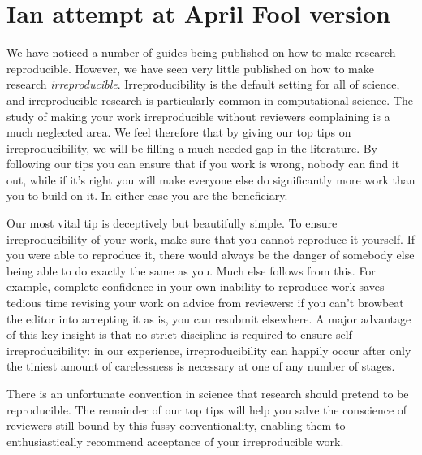 \documentclass[a4paper,11pt]{article}
\begin{document}
\section{Ian attempt at April Fool version}

We have noticed a number of guides being published on how to make research reproducible. However, we have seen very little published on how to make research \emph{irreproducible}.  Irreproducibility is the default setting for all of science, and irreproducible research is particularly common in computational science.  The study of making your work irreproducible without reviewers complaining is a much neglected area. We feel therefore that by giving our top tips on irreproducibility, we will be filling a much needed gap in the literature.
By following our tips you can ensure that if you work is wrong, nobody can find it out, while if it's right you will make everyone else do significantly more work than you to build on it. In either case you are the beneficiary.

Our most vital tip is deceptively but beautifully simple. To ensure irreproducibility of your work, make sure that you cannot reproduce it yourself. If you were able to reproduce it, there would always be the danger of somebody else being able to do exactly the same as you. Much else follows from this. For example, complete confidence in your own inability to reproduce work saves tedious time revising your work on advice from reviewers: if you can't browbeat the editor into accepting it as is, you can resubmit elsewhere. A major advantage of this key insight is that no strict discipline is required to ensure self-irreproducibility: in our experience, irreproducibility can happily occur after only the tiniest amount of carelessness is necessary at one of any number of stages.

There is an unfortunate convention in science that research should pretend to be reproducible. The remainder of our top tips will help you salve the conscience of reviewers still bound by this fussy conventionality, enabling them to enthusiastically recommend acceptance of your irreproducible work. 
\end{document}
